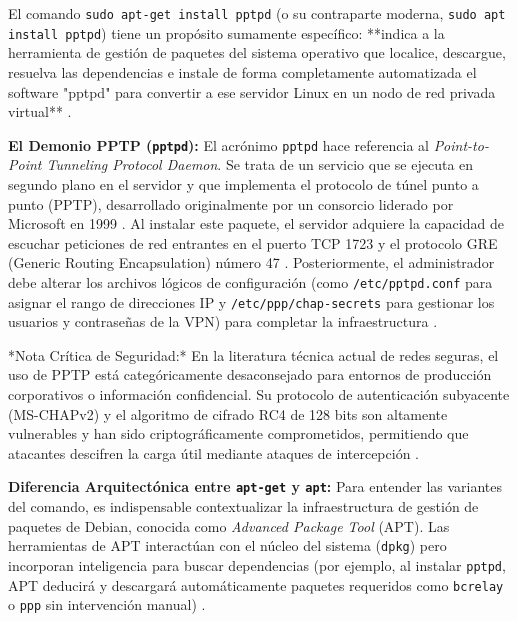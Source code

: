 \documentclass[a4paper,12pt]{article}
\begin{document}
El comando \texttt{sudo apt-get install pptpd} (o su contraparte moderna, \texttt{sudo apt install pptpd}) tiene un propósito sumamente específico: **indica a la herramienta de gestión de paquetes del sistema operativo que localice, descargue, resuelva las dependencias e instale de forma completamente automatizada el software "pptpd" para convertir a ese servidor Linux en un nodo de red privada virtual** \cite{digitalocean_pptp, geekland_pptp}.

\textbf{El Demonio PPTP (\texttt{pptpd}):}
El acrónimo \texttt{pptpd} hace referencia al \textit{Point-to-Point Tunneling Protocol Daemon}. Se trata de un servicio que se ejecuta en segundo plano en el servidor y que implementa el protocolo de túnel punto a punto (PPTP), desarrollado originalmente por un consorcio liderado por Microsoft en 1999 \cite{ticarte_pptp}. Al instalar este paquete, el servidor adquiere la capacidad de escuchar peticiones de red entrantes en el puerto TCP 1723 y el protocolo GRE (Generic Routing Encapsulation) número 47 \cite{ticarte_pptp, digitalocean_pptp}. Posteriormente, el administrador debe alterar los archivos lógicos de configuración (como \texttt{/etc/pptpd.conf} para asignar el rango de direcciones IP y \texttt{/etc/ppp/chap-secrets} para gestionar los usuarios y contraseñas de la VPN) para completar la infraestructura \cite{digitalocean_pptp, time4vps_pptp}. 

*Nota Crítica de Seguridad:* En la literatura técnica actual de redes seguras, el uso de PPTP está categóricamente desaconsejado para entornos de producción corporativos o información confidencial. Su protocolo de autenticación subyacente (MS-CHAPv2) y el algoritmo de cifrado RC4 de 128 bits son altamente vulnerables y han sido criptográficamente comprometidos, permitiendo que atacantes descifren la carga útil mediante ataques de intercepción \cite{protonvpn_protocols, ticarte_pptp}.

\textbf{Diferencia Arquitectónica entre \texttt{apt-get} y \texttt{apt}:}
Para entender las variantes del comando, es indispensable contextualizar la infraestructura de gestión de paquetes de Debian, conocida como \textit{Advanced Package Tool} (APT). Las herramientas de APT interactúan con el núcleo del sistema (\texttt{dpkg}) pero incorporan inteligencia para buscar dependencias (por ejemplo, al instalar \texttt{pptpd}, APT deducirá y descargará automáticamente paquetes requeridos como \texttt{bcrelay} o \texttt{ppp} sin intervención manual) \cite{aws_apt, cirelramos_pptp}.
\end{document}
